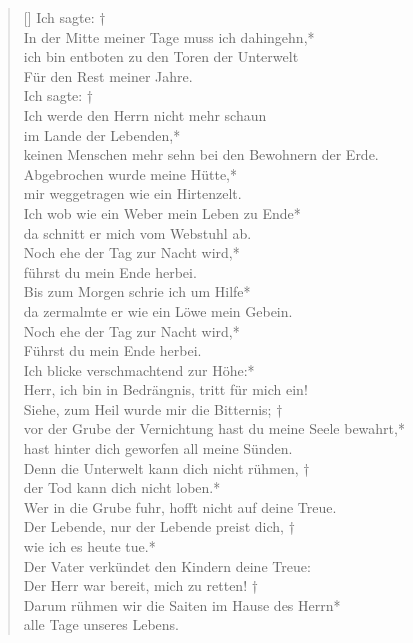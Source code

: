 \begin{verse}[\versewidth]
 Ich sagte: †\\
In der Mitte meiner Tage muss ich dahingehn,*\\
ich bin entboten zu den Toren der Unterwelt\\
Für den Rest meiner Jahre.\\
\vin Ich sagte: †\\
\vin Ich werde den Herrn nicht mehr schaun\\
im Lande der Lebenden,*\\
keinen Menschen mehr sehn bei den Bewohnern der Erde.\\
\vin Abgebrochen wurde meine Hütte,*\\
\vin mir weggetragen wie ein Hirtenzelt.\\
Ich wob wie ein Weber mein Leben zu Ende*\\
da schnitt er mich vom Webstuhl ab.\\
\vin Noch ehe der Tag zur Nacht wird,*\\
\vin führst du mein Ende herbei.\\
Bis zum Morgen schrie ich um Hilfe*\\
da zermalmte er wie ein Löwe mein Gebein.\\
\vin Noch ehe der Tag zur Nacht wird,*\\
\vin Führst du mein Ende herbei.\\
Ich blicke verschmachtend zur Höhe:*\\
Herr, ich bin in Bedrängnis, tritt für mich ein!\\

\vin Siehe, zum Heil wurde mir die Bitternis; †\\
\vin vor der Grube der Vernichtung hast du meine Seele bewahrt,*\\
hast hinter dich geworfen all meine Sünden.\\
\vin Denn die Unterwelt kann dich nicht rühmen, †\\
\vin der Tod kann dich nicht loben.*\\
\vin Wer in die Grube fuhr, hofft nicht auf deine Treue.\\
Der Lebende, nur der Lebende preist dich, †\\
wie ich es heute tue.*\\
Der Vater verkündet den Kindern deine Treue:\\
\vin Der Herr war bereit, mich zu retten! †\\
\vin Darum rühmen wir die Saiten im Hause des Herrn*\\
\vin alle Tage unseres Lebens.\\

\end{verse}

